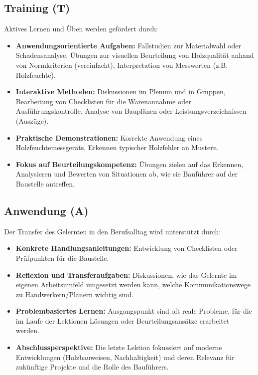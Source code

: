 \documentclass[12pt, a4paper]{article}
\begin{document}
\subsection{Training (T)}
Aktives Lernen und Üben werden gefördert durch:
\begin{itemize}
    \item \textbf{Anwendungsorientierte Aufgaben:} Fallstudien zur Materialwahl oder Schadensanalyse, Übungen zur visuellen Beurteilung von Holzqualität anhand von Normkriterien (vereinfacht), Interpretation von Messwerten (z.B. Holzfeuchte).
    \item \textbf{Interaktive Methoden:} Diskussionen im Plenum und in Gruppen, Bearbeitung von Checklisten für die Warenannahme oder Ausführungskontrolle, Analyse von Bauplänen oder Leistungsverzeichnissen (Auszüge).
    \item \textbf{Praktische Demonstrationen:} Korrekte Anwendung eines Holzfeuchtemessgeräts, Erkennen typischer Holzfehler an Mustern.
    \item \textbf{Fokus auf Beurteilungskompetenz:} Übungen zielen auf das Erkennen, Analysieren und Bewerten von Situationen ab, wie sie Bauführer auf der Baustelle antreffen.
\end{itemize}

\subsection{Anwendung (A)}
Der Transfer des Gelernten in den Berufsalltag wird unterstützt durch:
\begin{itemize}
    \item \textbf{Konkrete Handlungsanleitungen:} Entwicklung von Checklisten oder Prüfpunkten für die Baustelle.
    \item \textbf{Reflexion und Transferaufgaben:} Diskussionen, wie das Gelernte im eigenen Arbeitsumfeld umgesetzt werden kann, welche Kommunikationswege zu Handwerkern/Planern wichtig sind.
    \item \textbf{Problembasiertes Lernen:} Ausgangspunkt sind oft reale Probleme, für die im Laufe der Lektionen Lösungen oder Beurteilungsansätze erarbeitet werden.
    \item \textbf{Abschlussperspektive:} Die letzte Lektion fokussiert auf moderne Entwicklungen (Holzbauweisen, Nachhaltigkeit) und deren Relevanz für zukünftige Projekte und die Rolle des Bauführers.
\end{itemize}

\newpage
\end{document}

